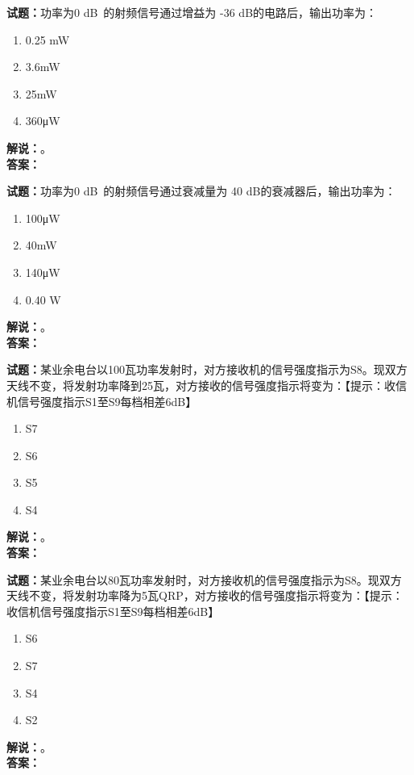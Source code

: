 \documentclass{ctexbook}
\begin{document}
\bigskip




\noindent\textbf{试题：}功率为0 \unit[qualifier-mode=combine]{\deci\bel{}}的射频信号通过增益为 -36 dB的电路后，输出功率为：
\begin{enumerate}[leftmargin=3em]
\item 0.25 mW
\item 3.6mW
\item 25mW
\item 360μW
\end{enumerate}
\noindent\textbf{解说：}\textbf{}。\\\noindent\textbf{答案：}

\bigskip




\noindent\textbf{试题：}功率为0 \unit[qualifier-mode=combine]{\deci\bel{}}的射频信号通过衰减量为 40 dB的衰减器后，输出功率为：
\begin{enumerate}[leftmargin=3em]
\item 100μW
\item 40mW
\item 140μW
\item 0.40 W
\end{enumerate}
\noindent\textbf{解说：}\textbf{}。\\\noindent\textbf{答案：}

\bigskip




\noindent\textbf{试题：}某业余电台以100瓦功率发射时，对方接收机的信号强度指示为S8。现双方天线不变，将发射功率降到25瓦，对方接收的信号强度指示将变为：【提示：收信机信号强度指示S1至S9每档相差6dB】
\begin{enumerate}[leftmargin=3em]
\item S7
\item S6
\item S5
\item S4
\end{enumerate}
\noindent\textbf{解说：}\textbf{}。\\\noindent\textbf{答案：}

\bigskip




\noindent\textbf{试题：}某业余电台以80瓦功率发射时，对方接收机的信号强度指示为S8。现双方天线不变，将发射功率降为5瓦QRP，对方接收的信号强度指示将变为：【提示：收信机信号强度指示S1至S9每档相差6dB】
\begin{enumerate}[leftmargin=3em]
\item S6
\item S7
\item S4
\item S2
\end{enumerate}
\noindent\textbf{解说：}\textbf{}。\\\noindent\textbf{答案：}
\end{document}
